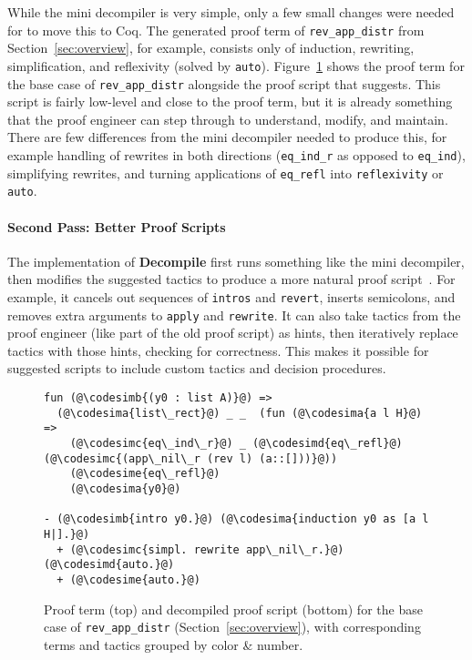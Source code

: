 While the mini decompiler is very simple, only a few small changes were needed for 
to move this to Coq.
The generated proof term of \lstinline{rev_app_distr} from Section~\ref{sec:overview},
for example, consists only of induction, rewriting, simplification, and reflexivity (solved by \lstinline{auto}).
Figure~\ref{fig:rainbow} shows the proof term for the base case of \lstinline{rev_app_distr} 
alongside the proof script that \toolnamec suggests.
This script is fairly low-level and close to the proof term, but it is already something that the proof engineer
can step through to understand, modify, and maintain.
There are few differences from the mini decompiler needed to produce this,
for example handling of rewrites in both directions (\lstinline{eq_ind_r} as opposed to \lstinline{eq_ind}),
simplifying rewrites,
and turning applications of \lstinline{eq_refl} into \lstinline{reflexivity} or \lstinline{auto}.

\paragraph{Second Pass: Better Proof Scripts}
The implementation of \textbf{Decompile} first runs something like the mini decompiler, then modifies the suggested tactics to produce a more natural proof script~\href{https://github.com/uwplse/coq-plugin-lib/tree/9ef05815c261de9c99b604c6b581ba1c4fbc1a46/src/coq/decompiler/decompiler.ml}{}. %
For example, it cancels out sequences of \lstinline{intros} and \lstinline{revert},
inserts semicolons, and removes extra arguments to \lstinline{apply} and \lstinline{rewrite}. %
It can also take tactics from the proof engineer (like part of the old proof script) as hints,
then iteratively replace tactics with those hints, checking for correctness.
This makes it possible for suggested scripts to include custom tactics and decision procedures.

\begin{figure}
\begin{lstlisting}
fun (@\codesimb{(y0 : list A)}@) =>
  (@\codesima{list\_rect}@) _ _  (fun (@\codesima{a l H}@) =>
    (@\codesimc{eq\_ind\_r}@) _ (@\codesimd{eq\_refl}@) (@\codesimc{(app\_nil\_r (rev l) (a::[]))}@))
    (@\codesime{eq\_refl}@)
    (@\codesima{y0}@)

- (@\codesimb{intro y0.}@) (@\codesima{induction y0 as [a l H|].}@)
  + (@\codesimc{simpl. rewrite app\_nil\_r.}@) (@\codesimd{auto.}@)
  + (@\codesime{auto.}@)
\end{lstlisting}
\vspace{-0.3cm}
\caption{Proof term (top) and decompiled proof script (bottom) for the base case of 
\lstinline{rev_app_distr} (Section~\ref{sec:overview}), with corresponding terms and tactics 
grouped by color \& number.}
\label{fig:rainbow}
\end{figure}

